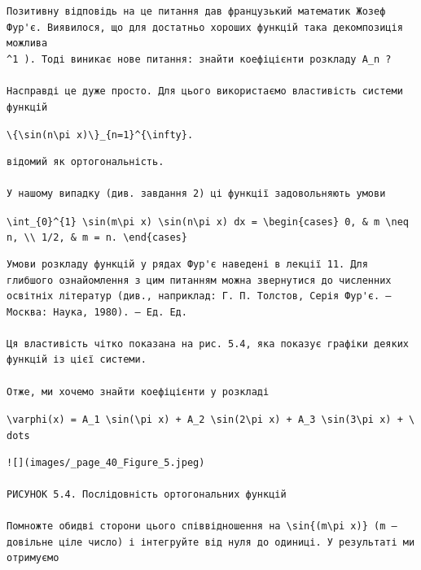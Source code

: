 \documentclass[
  ukrainian,
]{article}
\begin{document}
\begin{verbatim}
Позитивну відповідь на це питання дав французький математик Жозеф Фур'є. Виявилося, що для достатньо хороших функцій така декомпозиція можлива 
^1 ). Тоді виникає нове питання: знайти коефіцієнти розкладу A_n ?

Насправді це дуже просто. Для цього використаємо властивість системи функцій
\end{verbatim}

\texttt{\textbackslash{}\{\textbackslash{}sin(n\textbackslash{}pi\ x)\textbackslash{}\}\_\{n=1\}\^{}\{\textbackslash{}infty\}.}

\begin{verbatim}
відомий як ортогональність.

У нашому випадку (див. завдання 2) ці функції задовольняють умови
\end{verbatim}

\texttt{\textbackslash{}int\_\{0\}\^{}\{1\}\ \textbackslash{}sin(m\textbackslash{}pi\ x)\ \textbackslash{}sin(n\textbackslash{}pi\ x)\ dx\ =\ \textbackslash{}begin\{cases\}\ 0,\ \&\ m\ \textbackslash{}neq\ n,\ \textbackslash{}\textbackslash{}\ 1/2,\ \&\ m\ =\ n.\ \textbackslash{}end\{cases\}}

\begin{verbatim}
Умови розкладу функцій у рядах Фур'є наведені в лекції 11. Для глибшого ознайомлення з цим питанням можна звернутися до численних освітніх літератур (див., наприклад: Г. П. Толстов, Серія Фур'є. — Москва: Наука, 1980). — Ед. Ед.

Ця властивість чітко показана на рис. 5.4, яка показує графіки деяких функцій із цієї системи.

Отже, ми хочемо знайти коефіцієнти у розкладі
\end{verbatim}

\texttt{\textbackslash{}varphi(x)\ =\ A\_1\ \textbackslash{}sin(\textbackslash{}pi\ x)\ +\ A\_2\ \textbackslash{}sin(2\textbackslash{}pi\ x)\ +\ A\_3\ \textbackslash{}sin(3\textbackslash{}pi\ x)\ +\ \textbackslash{}dots}

\begin{verbatim}
![](images/_page_40_Figure_5.jpeg)

РИСУНОК 5.4. Послідовність ортогональних функцій

Помножте обидві сторони цього співвідношення на \sin{(m\pi x)} (m — довільне ціле число) і інтегруйте від нуля до одиниці. У результаті ми отримуємо
\end{verbatim}
\end{document}
